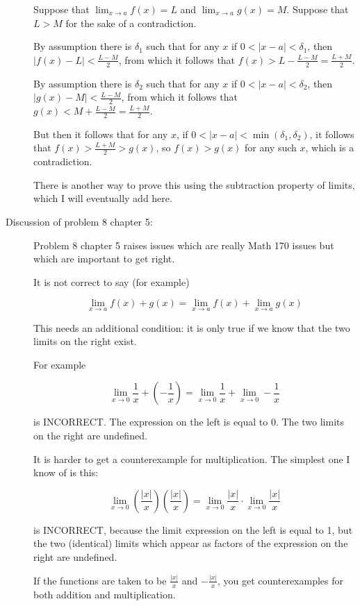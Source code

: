 \documentclass[12pt]{article}
\begin{document}
\begin{description}
Suppose that  $\lim_{x \rightarrow a}f(x)=L$ and $\lim_{x \rightarrow a}g(x)=M$.  Suppose that $L>M$ for the sake of a contradiction.

By assumption there is $\delta_1$ such that for any $x$  if $0<|x-a|<\delta_1$, then $|f(x)-L|<\frac{L-M}2$, from which it follows that $f(x)>L-\frac{L-M}2 = \frac{L+M}2$.

By assumption there is $\delta_2$ such that for any $x$  if $0<|x-a|<\delta_2$, then $|g(x)-M|<\frac{L-M}2$, from which it follows that $g(x)<M+\frac{L-M}2 = \frac{L+M}2$.

But then it follows that for any $x$, if $0<|x-a|<\min(\delta_1,\delta_2)$, it follows that $f(x)>\frac{L+M}2>g(x)$, so $f(x)>g(x)$ for any such $x$, which is a contradiction.

There is another way to prove this using the subtraction property of limits, which I will eventually add here.

\item[Discussion of problem 8 chapter 5:]

Problem 8 chapter 5 raises issues which are really Math 170 issues but which are important to get right.

It is not correct to say (for example)

$$\lim_{x \rightarrow a}f(x)+g(x)=\lim_{x\rightarrow a}f(x)+\lim_{x \rightarrow a}g(x)$$

This needs an additional condition:  it is only true if we know that the two limits on the right exist.

For example

$$\lim_{x\rightarrow 0}\frac 1x+ (-\frac1x) = \lim_{x \rightarrow 0} \frac1x + \lim_{x \rightarrow 0}-\frac1x$$

is INCORRECT.  The expression on the left is equal to 0.   The two limits on the right are undefined.

It is harder to get a counterexample for multiplication.  The simplest one I know of is this:

$$\lim_{x \rightarrow 0} (\frac{|x|}x)(\frac{|x|}x) = \lim_{x \rightarrow 0}\frac{|x|}x \cdot \lim_{x \rightarrow 0}\frac{|x|}x$$

is INCORRECT, because the limit expression on the left is equal to 1, but the two (identical) limits which appear as factors of the expression on the right are undefined.

If the functions are taken to be $\frac{|x|}x$ and $-\frac{|x|}x$, you get counterexamples for both addition and multiplication.


\end{description}
\end{document}
